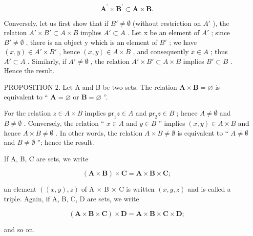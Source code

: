 \[
\mathbf {A} ^ {\prime} \times \mathbf {B} ^ {\prime} \subset \mathbf {A} \times \mathbf {B}.
\]

Conversely, let us first show that if \(B' \neq \emptyset\) (without restriction on \(A'\) ), the relation \(A' \times B' \subset A \times B\) implies \(A' \subset A\) . Let x be an element of \(A'\) ; since \(B' \neq \emptyset\) , there is an object y which is an element of \(B'\) ; we have \((x, y) \in A' \times B'\) , hence \((x, y) \in A \times B\) , and consequently \(x \in A\) ; thus \(A' \subset A\) . Similarly, if \(A' \neq \emptyset\) , the relation \(A' \times B' \subset A \times B\) implies \(B' \subset B\) . Hence the result.

PROPOSITION 2. Let A and B be two sets. The relation \(\mathbf{A} \times \mathbf{B} = \varnothing\) is equivalent to `` \(\mathbf{A} = \varnothing\) or \(\mathbf{B} = \varnothing\) ''.

For the relation \(z \in A \times B\) implies \(\mathsf{pr}_1z \in A\) and \(\mathsf{pr}_2z \in B\) ; hence \(A \neq \emptyset\) and \(B \neq \emptyset\) . Conversely, the relation `` \(x \in A\) and \(y \in B\) '' implies \((x, y) \in A \times B\) and hence \(A \times B \neq \emptyset\) . In other words, the relation \(A \times B \neq \emptyset\) is equivalent to `` \(A \neq \emptyset\) and \(B \neq \emptyset\) ''; hence the result.

If A, B, C are sets, we write

\[
(\mathbf {A} \times \mathbf {B}) \times \mathbf {C} = \mathbf {A} \times \mathbf {B} \times \mathbf {C};
\]

an element \(((x, y), z)\) of A × B × C is written \((x, y, z)\) and is called a triple. Again, if A, B, C, D are sets, we write

\[
(\mathbf {A} \times \mathbf {B} \times \mathbf {C}) \times \mathbf {D} = \mathbf {A} \times \mathbf {B} \times \mathbf {C} \times \mathbf {D};
\]

and so on.

